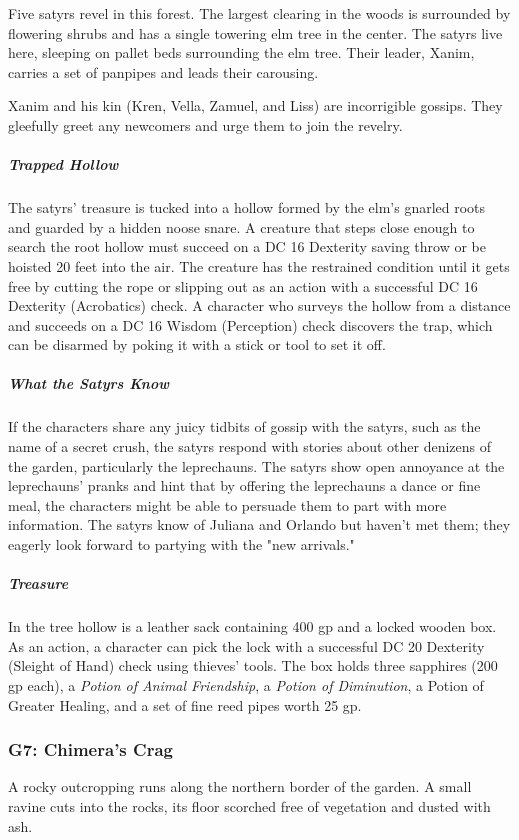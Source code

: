 \documentclass[10pt,a4paper,twoside,bg=print,twocolumn,openany,nodeprecatedcode]{dndbook}
\begin{document}
Five satyrs revel in this forest. The largest clearing in the woods is surrounded by flowering shrubs and has a single towering elm tree in the center. The satyrs live here, sleeping on pallet beds surrounding the elm tree. Their leader, Xanim, carries a set of panpipes and leads their carousing.

Xanim and his kin (Kren, Vella, Zamuel, and Liss) are incorrigible gossips. They gleefully greet any newcomers and urge them to join the revelry.

\subparagraph{Trapped Hollow}
The satyrs' treasure is tucked into a hollow formed by the elm's gnarled roots and guarded by a hidden noose snare. A creature that steps close enough to search the root hollow must succeed on a DC 16 Dexterity saving throw or be hoisted 20 feet into the air. The creature has the restrained condition until it gets free by cutting the rope or slipping out as an action with a successful DC 16 Dexterity (Acrobatics) check. A character who surveys the hollow from a distance and succeeds on a DC 16 Wisdom (Perception) check discovers the trap, which can be disarmed by poking it with a stick or tool to set it off.

\subparagraph{What the Satyrs Know}
If the characters share any juicy tidbits of gossip with the satyrs, such as the name of a secret crush, the satyrs respond with stories about other denizens of the garden, particularly the leprechauns. The satyrs show open annoyance at the leprechauns' pranks and hint that by offering the leprechauns a dance or fine meal, the characters might be able to persuade them to part with more information. The satyrs know of Juliana and Orlando but haven't met them; they eagerly look forward to partying with the "new arrivals."

\subparagraph{Treasure}
In the tree hollow is a leather sack containing 400 gp and a locked wooden box. As an action, a character can pick the lock with a successful DC 20 Dexterity (Sleight of Hand) check using thieves' tools. The box holds three sapphires (200 gp each), a \textit{Potion of Animal Friendship}, a \textit{Potion of Diminution}, a Potion of Greater Healing, and a set of fine reed pipes worth 25 gp.

\subsubsection{G7: Chimera's Crag}
\begin{DndReadAloud}{}
A rocky outcropping runs along the northern border of the garden. A small ravine cuts into the rocks, its floor scorched free of vegetation and dusted with ash.

\end{DndReadAloud}
\end{document}
